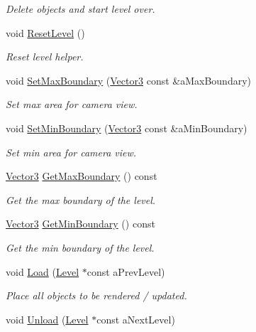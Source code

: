 \begin{DoxyCompactItemize}
\begin{DoxyCompactList}\small\item\em Delete objects and start level over. \end{DoxyCompactList}\item 
void \hyperlink{classLevel_a101bb0a4de534608fdae6a854f531298}{Reset\+Level} ()
\begin{DoxyCompactList}\small\item\em Reset level helper. \end{DoxyCompactList}\item 
void \hyperlink{classLevel_a1515066519ebd636a28f9ac50a4b1047}{Set\+Max\+Boundary} (\hyperlink{structVector3}{Vector3} const \&a\+Max\+Boundary)
\begin{DoxyCompactList}\small\item\em Set max area for camera view. \end{DoxyCompactList}\item 
void \hyperlink{classLevel_afd583490b92f38e4e5c00c949f6f19c1}{Set\+Min\+Boundary} (\hyperlink{structVector3}{Vector3} const \&a\+Min\+Boundary)
\begin{DoxyCompactList}\small\item\em Set min area for camera view. \end{DoxyCompactList}\item 
\hyperlink{structVector3}{Vector3} \hyperlink{classLevel_ae4288c0441424f647ccb37050d46cec4}{Get\+Max\+Boundary} () const 
\begin{DoxyCompactList}\small\item\em Get the max boundary of the level. \end{DoxyCompactList}\item 
\hyperlink{structVector3}{Vector3} \hyperlink{classLevel_abcbd61df967a743d7aa49bbe8c27ecb7}{Get\+Min\+Boundary} () const 
\begin{DoxyCompactList}\small\item\em Get the min boundary of the level. \end{DoxyCompactList}\item 
void \hyperlink{classLevel_ad274e8fe0e9d4598988011729b4f864a}{Load} (\hyperlink{classLevel}{Level} $\ast$const a\+Prev\+Level)
\begin{DoxyCompactList}\small\item\em Place all objects to be rendered / updated. \end{DoxyCompactList}\item 
void \hyperlink{classLevel_a38d35739cb91337abb22f8591203e4cc}{Unload} (\hyperlink{classLevel}{Level} $\ast$const a\+Next\+Level)

\end{DoxyCompactItemize}
